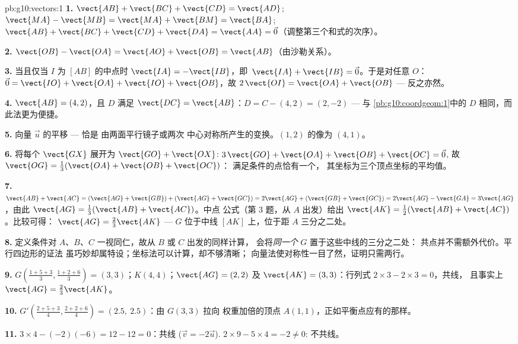 \begin{solution}{pb:g10:vectors:1}
\textbf{1.} $\vect{AB} + \vect{BC} + \vect{CD} = \vect{AD}$;
\quad $\vect{MA} - \vect{MB} = \vect{MA} + \vect{BM} =
\vect{BA}$; \quad $\vect{AB} + \vect{BC} + \vect{CD} +
\vect{DA} = \vect{AA} = \vec 0$（调整第三个和式的次序）。

\textbf{2.} $\vect{OB} - \vect{OA} = \vect{AO} + \vect{OB} =
\vect{AB}$（由沙勒关系）。

\textbf{3.} 当且仅当 $I$ 为 $[AB]$ 的中点时
$\vect{IA} = -\vect{IB}$，即\
$\vect{IA} + \vect{IB} = \vec 0$。于是对任意 $O$：
$\vec 0 = \vect{IO} + \vect{OA} + \vect{IO} + \vect{OB}$，故
$2\,\vect{OI} = \vect{OA} + \vect{OB}$ --- 反之亦然。

\textbf{4.} $\vect{AB} = (4, 2)$，且 $D$ 满足
$\vect{DC} = \vect{AB}$：$D = C - (4, 2) = (2, -2)$ --- 与
\cref{pb:g10:coordgeom:1}中的 $D$ 相同，而此法更为便捷。

\textbf{5.} 向量 $\vec u$ 的平移 --- 恰是
由两面平行镜子或两次
中心对称所产生的变换。$(1, 2)$ 的像为 $(4, 1)$。

\textbf{6.} 将每个 $\vect{GX}$ 展开为
$\vect{GO} + \vect{OX}$:
$3\,\vect{GO} + \vect{OA} + \vect{OB} + \vect{OC} = \vec 0$,
故 $\vect{OG} = \frac13(\vect{OA} + \vect{OB} + \vect{OC})$：
满足条件的点恰有一个，
其坐标为三个顶点坐标的平均值。

\textbf{7.} $\vect{AB} + \vect{AC} =
(\vect{AG} + \vect{GB}) + (\vect{AG} + \vect{GC})
= 2\vect{AG} + (\vect{GB} + \vect{GC})
= 2\vect{AG} - \vect{GA} = 3\vect{AG}$，由此
$\vect{AG} = \frac13(\vect{AB} + \vect{AC})$。中点
公式（第 3 题，从 $A$ 出发）给出
$\vect{AK} = \frac12(\vect{AB} + \vect{AC})$。比较可得：
$\vect{AG} = \frac23\vect{AK}$ --- $G$ 位于中线
$[AK]$ 上，位于距 $A$ 三分之二处。

\textbf{8.} 定义条件对 $A$、$B$、$C$
一视同仁，故从 $B$ 或 $C$ 出发的同样计算，
会将\emph{同一个} $G$ 置于这些中线的三分之二处：
共点并不需额外代价。平行四边形的证法
虽巧妙却属特设；坐标法可以计算，却不够清晰；
向量法使对称性一目了然，证明只需两行。

\textbf{9.} $G\left(\frac{1+5+3}{3}, \frac{1+2+6}{3}\right) =
(3, 3)$；$K(4, 4)$；$\vect{AG} = (2, 2)$ 及
$\vect{AK} = (3, 3)$：行列式
$2 \times 3 - 2 \times 3 = 0$，共线，
且事实上 $\vect{AG} = \frac23\vect{AK}$。

\textbf{10.} $G'\left(\frac{2 + 5 + 3}{4}, \frac{2 + 2 +
6}{4}\right) = (2.5,\ 2.5)$：由 $G(3,3)$ 拉向
权重加倍的顶点 $A(1,1)$，正如平衡点应有的那样。

\textbf{11.} $3 \times 4 - (-2)(-6) = 12 - 12 = 0$：共线
($\vec v = -2\vec u$). $2 \times 9 - 5 \times 4 = -2 \neq 0$:
不共线。


\end{solution}
